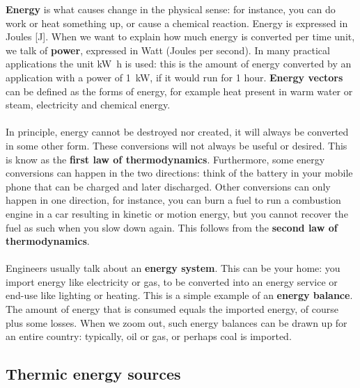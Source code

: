 \documentclass[../summary.tex]{subfiles}
\begin{document}
	\textbf{Energy} is what causes change in the physical sense: for instance, you can do work or heat something up, or cause a chemical reaction. Energy is expressed in Joules [\unit{\joule}]. When we want to explain how much energy is converted per time unit, we talk of \textbf{power}, expressed in Watt (Joules per second). In many practical applications the unit \unit{\kilo\watt\hour} is used: this is the amount of energy converted by an application with a power of \SI{1}{\kilo\watt}, if it would run for 1 hour. \textbf{Energy vectors} can be defined as the forms of energy, for example heat present in warm water or steam, electricity and chemical energy.
	\\\\
	In principle, energy cannot be destroyed nor created, it will always be converted in some other form. These conversions will not always be useful or desired. This is know as the \textbf{first law of thermodynamics}. Furthermore, some energy conversions can happen in the two directions: think of the battery in your mobile phone that can be charged and later discharged. Other conversions can only happen in one direction, for instance, you can burn a fuel to run a combustion engine in a car resulting in kinetic or motion energy, but you cannot recover the fuel as such when you slow down again. This follows from the \textbf{second law of thermodynamics}.
	\\\\
	Engineers usually talk about an \textbf{energy system}. This can be your home: you import energy like electricity or gas, to be converted into an energy service or end-use like lighting or heating. This is a simple example of an \textbf{energy balance}. The amount of energy that is consumed equals the imported energy, of course plus some losses. When we zoom out, such energy balances can be drawn up for an entire country: typically, oil or gas, or perhaps coal is imported.
	
	\subsection{Thermic energy sources}
	
\end{document}
